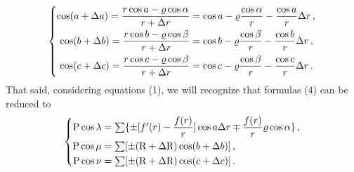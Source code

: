 \documentclass[leqno,openright,smallroyalvopaper,8pt,twoside,showtrims]{memoir}
\begin{document}
\begin{equation}
\begin{dcases}
\begin{aligned}
\cos(a+\Delta a)=\dfrac{r\cos a-\varrho\cos\alpha}{r+\Delta r}&=\cos a - \varrho\dfrac{\cos \alpha}{r}-\dfrac{\cos a}{r}\Delta r\,,\\
\cos(b+\Delta b)=\dfrac{r\cos b-\varrho\cos\beta}{r+\Delta r}&=\cos b - \varrho\dfrac{\cos \beta}{r}-\dfrac{\cos b}{r}\Delta r\,,\\
\cos(c+\Delta c)=\dfrac{r\cos c-\varrho\cos\beta}{r+\Delta r}&=\cos c - \varrho\dfrac{\cos \beta}{r}-\dfrac{\cos c}{r}\Delta r\,.
\end{aligned}
\end{dcases}
\end{equation}
That said, considering equations (1), we will recognize that formulas (4) can be reduced to
\begin{equation}
\begin{dcases}
\begin{aligned}
\text{P}\cos\lambda&=\textstyle\sum\{\pm [f'(r)-\dfrac{f(r)}{r}]\cos a \Delta r\mp\dfrac{f(r)}{r}\varrho\cos\alpha\}\,,\\
\text{P}\cos\mu&=\textstyle\sum[\pm (\text{R}+\Delta\text{R})\cos(b+\Delta b)]\,,\\
\text{P}\cos\nu&=\textstyle\sum[\pm (\text{R}+\Delta\text{R})\cos(c+\Delta c)]\,.
\end{aligned}
\end{dcases}
\end{equation}
\end{document}
